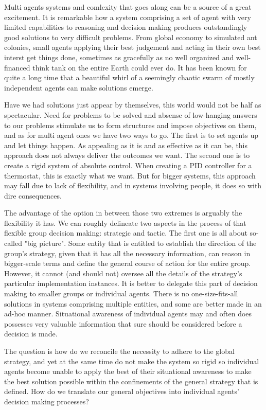 Multi agents systems and comlexity that goes along can be a source of a great excitement. It is remarkable how a system
comprising a set of agent with very limited capabilities to reasoning and decision making produces outstandingly good
solutions to very difficult problems. From global economy to simulated ant colonies, small agents applying their best
judgement and acting in their own best interst get things done, sometimes as gracefully as no well organized and
well-financed think tank on the entire Earth could ever do. It has been known for quite a long time that a beautiful
whirl of a seemingly chaotic swarm of mostly independent agents can make solutions emerge.

Have we had solutions just appear by themselves, this world would not be half as spectacular. Need for problems to be
solved and absense of low-hanging answers to our problems stimulate us to form structures and impose objectives on them,
and as for multi agent ones we have two ways to go. The first is to set agents up and let things happen. As appealing as
it is and as
effective as it can be, this approach does not always deliver the outcomes we want. The second one is to create a rigid
system of absolute control. When creating a PID controller for a thermostat, this is exactly what we want. But for
bigger systems, this approach may fall due to lack of flexibility, and in systems involving people, it
does so with dire consequences.

The advantage of the option in between those two extremes is arguably the flexibility it has. We can roughly delineate
two aspects in the process of that flexible group decision making: strategic and tactic. The first one is all about
so-called "big picture". Some entity that is entitled to establish the direction of the group's strategy, given that it
has all the necessary information, can reason in bigger-scale terms and define the general course of action for the
entire group. However, it cannot (and should not) oversee all the details of the strategy's particular implementation
instances. It is better to delegate this part of decision making to smaller groups or individual agents. There is no
one-size-fits-all solutions in systems comprising multiple entities, and some are better made in an ad-hoc manner.
Situational awareness of individual agents may and often does possesses very valuable information that sure should be
considered before a decision is made.

The question is how do we reconcile the necessity to adhere to the global strategy, and yet at the same time do not make
the system so rigid so individual agents become unable to apply the best of their situational awareness to make the best
solution possible within the confinements of the general strategy that is defined. How do we translate our general
objectives into individual agents' decision making processes?

